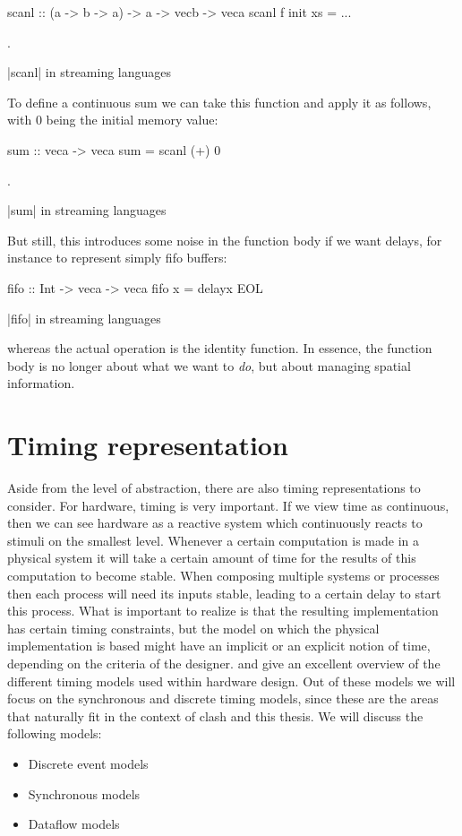 \begin{source}
\begin{code}
scanl :: (a -> b -> a) -> a -> vecb -> veca
scanl f init xs = ...
\end{code}.
\caption{|scanl| in streaming languages}
\end{source}
To define a continuous sum we can take this function and apply it as follows, with 0 being the initial memory value:
\begin{source}
\begin{code}
sum :: veca -> veca
sum = scanl (+) 0
\end{code}.
\caption{|sum| in streaming languages}
\end{source}
But still, this introduces some noise in the function body if we want delays, for instance to represent simply fifo buffers:
\begin{source}
\begin{code}
fifo :: Int -> veca -> veca
fifo x = delayx EOL
\end{code}
\caption{|fifo| in streaming languages}
\end{source}
whereas the actual operation is the identity function.
In essence, the function body is no longer about what we want to \textit{do}, but about managing spatial information.

\section{Timing representation}
Aside from the level of abstraction, there are also timing representations to consider. 
For hardware, timing is very important. 
If we view time as continuous, then we can see hardware as a reactive system which continuously reacts to stimuli on the smallest level.
Whenever a certain computation is made in a physical system it will take a certain amount of time for the results of this computation to become stable.
When composing multiple systems or processes then each process will need its inputs stable, leading to a certain delay to start this process. 
What is important to realize is that the resulting implementation has certain timing constraints, but the model on which the physical implementation is based might have an implicit or an explicit notion of time, depending on the criteria of the designer.
\cite{jantsch2005models} and \cite{chang1997heterogeneous} give an excellent overview of the different timing models used within hardware design.
Out of these models we will focus on the synchronous and discrete timing models, since these are the areas that naturally fit in the context of \gls{clash} and this thesis.
We will discuss the following models:
\begin{itemize}
 \item Discrete event models
 \item Synchronous models
 \item Dataflow models
\end{itemize}

